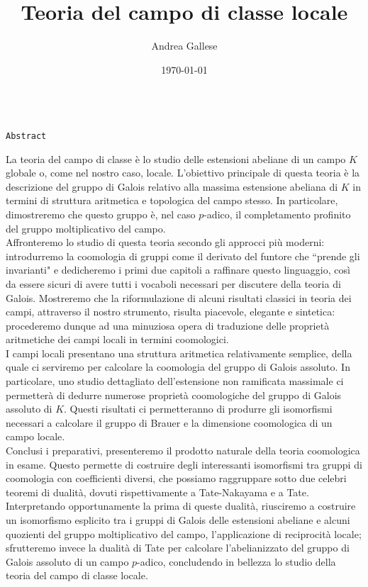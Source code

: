 \documentclass[a4paper]{article}
\title{Teoria del campo di classe locale}\let\Title\@title
\author{Andrea Gallese}\let\Author\@author
\date{\today}\let\Date\@date
\newcommand{\Intitola}{\begin{center}
		\vspace*{2 cm}
		{\huge \textsc{\Title}} \\
		\vspace{1,5 cm}
		{\Large \texttt{Abstract}}
		\thispagestyle{empty}
		\vspace{0,3 cm}
\end{center}}
\theoremstyle{remark}
\theoremstyle{definition}
\begin{document}
\Intitola

La teoria del campo di classe è lo studio delle estensioni abeliane di un campo $ K $ globale o, come nel nostro caso, locale. L'obiettivo principale di questa teoria è la descrizione del gruppo di Galois relativo alla massima estensione abeliana di $K$ in termini di struttura aritmetica e topologica del campo stesso. In particolare, dimostreremo che questo gruppo è, nel caso $p$-adico, il completamento profinito del gruppo moltiplicativo del campo. \\

Affronteremo lo studio di questa teoria secondo gli approcci più moderni: introdurremo la coomologia di gruppi come il derivato del funtore che \textquotedblleft prende gli invarianti" e dedicheremo i primi due capitoli a raffinare questo linguaggio, così da essere sicuri di avere tutti i vocaboli necessari per discutere della teoria di Galois. Mostreremo che la riformulazione di alcuni risultati classici in teoria dei campi, attraverso il nostro strumento, risulta piacevole, elegante e sintetica: procederemo dunque ad una minuziosa opera di traduzione delle proprietà aritmetiche dei campi locali in termini coomologici. \\

I campi locali presentano una struttura aritmetica relativamente semplice, della quale ci serviremo per calcolare la coomologia del gruppo di Galois assoluto. In particolare, uno studio dettagliato dell'estensione non ramificata massimale ci permetterà di dedurre numerose proprietà coomologiche del gruppo di Galois assoluto di $K$. Questi risultati ci permetteranno di produrre gli isomorfismi necessari a calcolare il gruppo di Brauer e la dimensione coomologica di un campo locale. \\

Conclusi i preparativi, presenteremo il prodotto naturale della teoria coomologica in esame. Questo permette di costruire degli interessanti isomorfismi tra gruppi di coomologia con coefficienti diversi, che possiamo raggruppare sotto due celebri teoremi di dualità, dovuti rispettivamente a Tate-Nakayama e a Tate. Interpretando opportunamente la prima di queste dualità, riusciremo a costruire un isomorfismo esplicito tra i gruppi di Galois delle estensioni abeliane e alcuni quozienti del gruppo  moltiplicativo del campo, l'applicazione di reciprocità locale; sfrutteremo invece la dualità di Tate per calcolare l'abelianizzato del gruppo di Galois assoluto di un campo $ p $-adico, concludendo in bellezza lo studio della teoria del campo di classe locale. \\


\vspace{0,3 cm}
\begin{flushright}
	{\large\texttt{\Author}}
\end{flushright}
\end{document}
